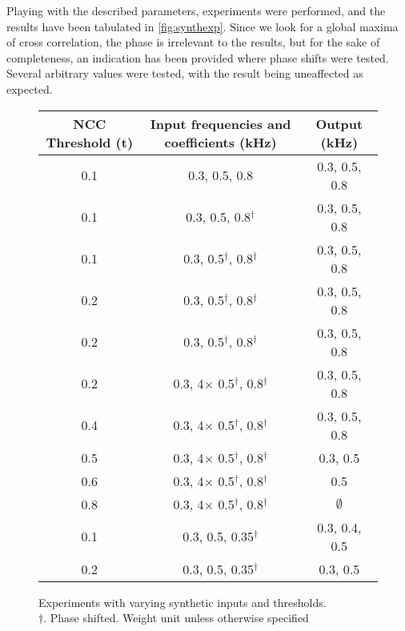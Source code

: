 Playing with the described parameters, experiments were performed, and the
results have been tabulated in \autoref{fig:synthexp}. Since we look for a
global maxima of cross correlation, the phase is irrelevant to the results, but
for the sake of completeness, an indication has been provided where phase shifts
were tested. Several arbitrary values were tested, with the result being
uneaffected as expected.

\begin{figure}[ht]
    \centering
    \def\arraystretch{1.5}
    \setlength\tabcolsep{2em}
    \begin{tabular}{c | c | c}
        NCC Threshold (t)   & Input frequencies and coefficients (kHz)      & Output (kHz)  \\ \hline
        0.1                 & 0.3, 0.5, 0.8                                 & 0.3, 0.5, 0.8 \\
        0.1                 & 0.3, 0.5, 0.8$^\dagger$                       & 0.3, 0.5, 0.8 \\
        0.1                 & 0.3, 0.5$^\dagger$, 0.8$^\dagger$             & 0.3, 0.5, 0.8 \\
        0.2                 & 0.3, 0.5$^\dagger$, 0.8$^\dagger$             & 0.3, 0.5, 0.8 \\
        0.2                 & 0.3, 0.5$^\dagger$, 0.8$^\dagger$             & 0.3, 0.5, 0.8 \\
        0.2                 & 0.3, 4$\times$ 0.5$^\dagger$, 0.8$^\dagger$   & 0.3, 0.5, 0.8 \\
        0.4                 & 0.3, 4$\times$ 0.5$^\dagger$, 0.8$^\dagger$   & 0.3, 0.5, 0.8 \\
        0.5                 & 0.3, 4$\times$ 0.5$^\dagger$, 0.8$^\dagger$   & 0.3, 0.5      \\
        0.6                 & 0.3, 4$\times$ 0.5$^\dagger$, 0.8$^\dagger$   & 0.5           \\
        0.8                 & 0.3, 4$\times$ 0.5$^\dagger$, 0.8$^\dagger$   & $\emptyset$   \\
        0.1                 & 0.3, 0.5, 0.35$^\dagger$                      & 0.3, 0.4, 0.5 \\
        0.2                 & 0.3, 0.5, 0.35$^\dagger$                      & 0.3, 0.5     
    \end{tabular}
    \captionsetup{justification=centering}
    \caption{Experiments with varying synthetic inputs and thresholds.\\
    $\dagger.$ Phase shifted. Weight unit unless otherwise specified}
    \label{fig:synthexp}

\end{figure}


